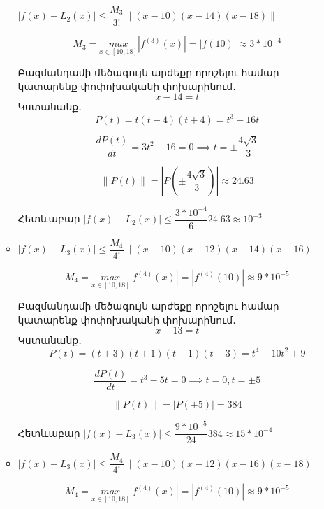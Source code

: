 \documentclass{article}
\begin{document}
\begin{enumerate}
\begin{itemize}
	$|f\left(x\right) - L_{2}\left(x\right)| \leq \dfrac{M_{3}}{3!} \lVert \left(x - 10\right)\left(x - 14\right)\left(x - 18\right) \rVert$

	$$M_{3} = \underset{x \in \left[10, 18\right]}{max}\left|f^{\left(3\right)}\left(x\right)\right| =\left| f\left(10\right)\right| \approx 3 * 10^{-4}$$




	Բազմանդամի մեծագույն արժեքը որոշելու համար կատարենք փոփոխականի փոխարինում․
												$$x - 14 = t$$
	Կստանանք․
				$$P\left(t\right) = t \left(t-4\right) \left(t+4\right) = t^{3} - 16 t$$

				$$ \dfrac{d P\left(t\right)}{dt} = 3 t^{2} - 16 = 0 \implies t = \pm \dfrac{4 \sqrt{3}}{3}$$

				$$\lVert P\left(t\right) \rVert= \left|P\left(  \pm \dfrac{4 \sqrt{3}}{3}   \right)\right| \approx 24.63$$

				Հետևաբար $|f\left(x\right) - L_{2}\left(x\right)| \leq \dfrac{3 * 10^{-4}}{6} 24.63 \approx 10^{-3}$

\item

	$|f\left(x\right) - L_{3}\left(x\right)| \leq \dfrac{M_{4}}{4!} \lVert \left(x - 10\right)\left(x - 12\right)\left(x - 14\right)\left(x - 16\right)\rVert$

	$$M_{4} = \underset{x \in \left[10, 18\right]}{max}\left|f^{\left(4\right)}\left(x\right)\right| = \left|f^{\left(4\right)}\left(10\right)\right| \approx 9 * 10^{-5}$$

	Բազմանդամի մեծագույն արժեքը որոշելու համար կատարենք փոփոխականի փոխարինում․
												$$x - 13 = t$$
	Կստանանք․
				$$P\left(t\right) =  \left(t+3\right) \left(t+1\right) \left(t-1\right) \left(t-3\right) = t^{4} - 10 t^{2} + 9$$

				$$ \dfrac{d P\left(t\right)}{dt} = t^{3} - 5 t = 0 \implies t = 0, t = \pm 5$$

				$$\lVert P\left(t\right) \rVert= \left|P\left( \pm 5   \right)\right| = 384$$

				Հետևաբար $|f\left(x\right) - L_{3}\left(x\right)| \leq \dfrac{9 * 10^{-5}}{24} 384 \approx 15 * 10^{-4}$

\item 

	$|f\left(x\right) - L_{3}\left(x\right)| \leq \dfrac{M_{4}}{4!} \lVert \left(x - 10\right)\left(x - 12\right)\left(x - 16\right)\left(x - 18\right)\rVert$

	$$M_{4} = \underset{x \in \left[10, 18\right]}{max}\left|f^{\left(4\right)}\left(x\right)\right| =\left| f^{\left(4\right)}\left(10\right)\right| \approx 9 * 10^{-5}$$


\end{itemize}
\end{enumerate}
\end{document}
